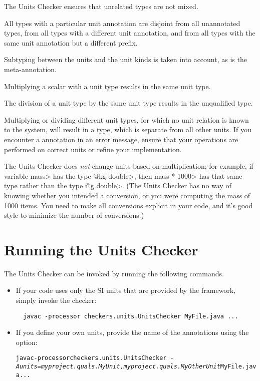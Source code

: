The Units Checker ensures that unrelated types are not mixed. 

All types with a particular unit annotation are
disjoint from all unannotated types, from all types with a different unit
annotation, and from all types with the same unit annotation but a
different prefix.

Subtyping between the units and the unit kinds is taken into account,
as is the  meta-annotation.

Multiplying a scalar with a unit type results in the same unit type.

The division of a unit type by the same unit type
results in the unqualified type.

Multiplying or dividing different unit types, for which no unit
relation is known to the system, will result in a 
type, which is separate from all other units.
If you encounter a  annotation in an error message,
ensure that your operations are performed on correct units or refine
your  implementation.

The Units Checker does \emph{not} change units based on multiplication; for
example, if variable \<mass> has the type \<@kg double>, then \<mass *
1000> has that same type rather than the type \<@g double>.  (The Units
Checker has no way of knowing whether you intended a conversion, or you
were computing the mass of 1000 items.  You need to make all conversions
explicit in your code, and it's good style to minimize the number of
conversions.)


\section{Running the Units Checker\label{units-running}}

The Units Checker can be invoked by running the following commands.

\begin{itemize}
\item
If your code uses only the SI units that are provided by the
framework, simply invoke the checker:

\begin{Verbatim}
  javac -processor checkers.units.UnitsChecker MyFile.java ...
\end{Verbatim}

\item 
If you define your own units, provide the name of the annotations using the
 option:

\begin{alltt}
  javac -processor checkers.units.UnitsChecker \
        \textit{-Aunits=myproject.quals.MyUnit,myproject.quals.MyOtherUnit} MyFile.java ...
\end{alltt}
\end{itemize}



